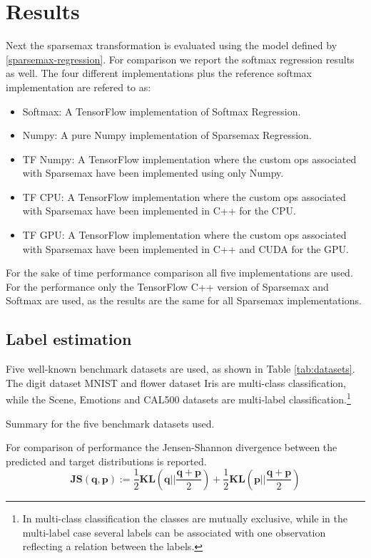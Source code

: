 \section{Results}
Next the sparsemax transformation is evaluated using the model defined by \eqref{sparsemax-regression}. For comparison we report the softmax regression results as well. The four different implementations plus the reference softmax implementation are refered to as:
\begin{itemize}
\item Softmax: A TensorFlow implementation of Softmax Regression.
\item Numpy: A pure Numpy implementation of Sparsemax Regression.
\item TF Numpy: A TensorFlow implementation where the custom ops associated with Sparsemax have been implemented using only Numpy.
\item TF CPU: A TensorFlow implementation where the custom ops associated with Sparsemax have been implemented in C++ for the CPU.
\item TF GPU: A TensorFlow implementation where the custom ops associated with Sparsemax have been implemented in C++ and CUDA for the GPU.
\end{itemize}
For the sake of time performance comparison all five implementations are used. For the performance only the TensorFlow C++ version of Sparsemax and Softmax are used, as the results are the same for all Sparsemax implementations.

\subsection{Label estimation}
Five well-known benchmark datasets are used, as shown in Table \ref{tab:datasets}. The digit dataset MNIST and flower dataset Iris are multi-class classification, while the Scene, Emotions and CAL500 datasets are multi-label classification.\footnote{In multi-class classification the classes are mutually exclusive, while in the multi-label case several labels can be associated with one observation reflecting a relation between the labels.} 
\begin{table}[H]
\centering

\caption{Summary for the five benchmark datasets used.}
\label{tab:datasets}
\end{table}
For comparison of performance the Jensen-Shannon divergence between the predicted and target distributions is reported.
\begin{equation*}
\mathbf{JS(q,p)}:=\frac{1}{2}\mathbf{KL}\left(\mathbf{q}\Big|\Big|\frac{\mathbf{q}+\mathbf{p}}{2}\right)+\frac{1}{2}\mathbf{KL}\left(\mathbf{p}\Big|\Big|\frac{\mathbf{q}+\mathbf{p}}{2}\right)
\end{equation*}

